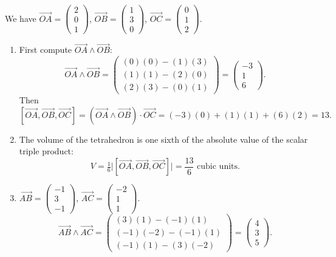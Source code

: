 \documentclass[11pt]{article}
\begin{document}
\begin{corrige}
We have $\vec{OA} = \begin{pmatrix} 2 \\ 0 \\ 1 \end{pmatrix}$, $\vec{OB} = \begin{pmatrix} 1 \\ 3 \\ 0 \end{pmatrix}$, $\vec{OC} = \begin{pmatrix} 0 \\ 1 \\ 2 \end{pmatrix}$.
\begin{enumerate}
\item First compute $\vec{OA} \wedge \vec{OB}$:
\[
\vec{OA} \wedge \vec{OB} = \begin{pmatrix} (0)(0) - (1)(3) \\ (1)(1) - (2)(0) \\ (2)(3) - (0)(1) \end{pmatrix} = \begin{pmatrix} -3 \\ 1 \\ 6 \end{pmatrix}.
\]
Then
\[
[\vec{OA}, \vec{OB}, \vec{OC}] = (\vec{OA} \wedge \vec{OB}) \cdot \vec{OC} = (-3)(0) + (1)(1) + (6)(2) = 13.
\]
\item The volume of the tetrahedron is one sixth of the absolute value of the scalar triple product:
\[
V = \tfrac{1}{6}\bigl|[\vec{OA}, \vec{OB}, \vec{OC}]\bigr| = \frac{13}{6} \text{ cubic units}.
\]
\item $\vec{AB} = \begin{pmatrix} -1 \\ 3 \\ -1 \end{pmatrix}$, $\vec{AC} = \begin{pmatrix} -2 \\ 1 \\ 1 \end{pmatrix}$.
\[
\vec{AB} \wedge \vec{AC} = \begin{pmatrix} (3)(1) - (-1)(1) \\ (-1)(-2) - (-1)(1) \\ (-1)(1) - (3)(-2) \end{pmatrix} = \begin{pmatrix} 4 \\ 3 \\ 5 \end{pmatrix}.
\]
\end{enumerate}
\end{corrige}
\end{document}
